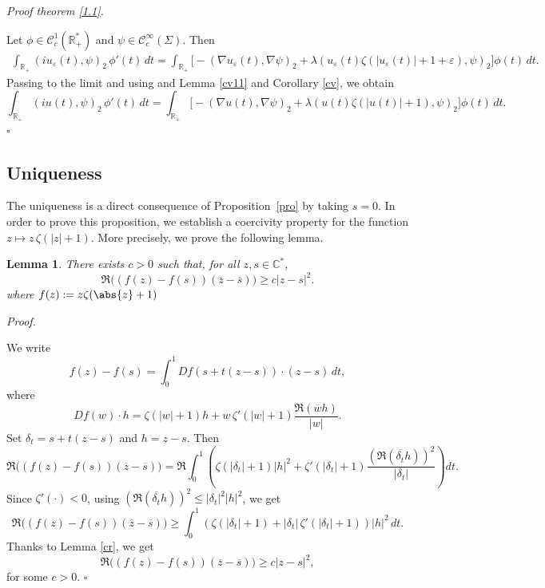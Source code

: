 \documentclass[10pt]{article}
\newtheorem{lemma}[theorem]{Lemma}
\renewenvironment{proof}[1][Proof]{%
  \noindent\textit{#1. }%
}{\hfill$\square$\vspace{4pt}}
\begin{document}
\begin{proof}[Proof theorem \ref{1.1}]
Let $\phi \in \mathcal{C}_c^1(\mathbb{R}_+^*)$ and $\psi \in \mathcal{C}_c^\infty(\Sigma)$. Then
\begin{align*}
\int_{\mathbb{R}_+} (i u_\varepsilon(t), \psi)_2 \, \phi'(t) \, dt
= \int_{\mathbb{R}_+} \Big[ - (\nabla u_\varepsilon(t), \nabla \psi)_2
+ \lambda (u_\varepsilon(t) \zeta(|u_\varepsilon(t)|+1+\varepsilon), \psi)_2 \Big] \phi(t) \, dt.
\end{align*}
Passing to the limit and using and Lemma \ref{cv11} and Corollary \ref{cv}, we obtain
\[
\int_{\mathbb{R}_+} (i u(t), \psi)_2 \, \phi'(t) \, dt
= \int_{\mathbb{R}_+} \Big[ - (\nabla u(t), \nabla \psi)_2
+ \lambda (u(t) \zeta(|u(t)|+1), \psi)_2 \Big] \phi(t) \, dt.
\]
\end{proof}







\subsection{Uniqueness}
The uniqueness is a direct consequence of Proposition~\ref{pro} by taking $s = 0$.
In order to prove this proposition, we establish a coercivity property for the function
$z \mapsto z\,\zeta(|z|+1)$.
More precisely, we prove the following lemma.

\begin{lemma}\label{uni}
There exists $c>0$ such that, for all $z,s \in \mathbb{C}^*$,
\[
\Re\big( (f(z)-f(s)) (\overline{z}-\overline{s}) \big) \ge c |z-s|^2.
\]
where $f(z):=z\zeta(\abs{z}+1)$
\end{lemma}

\begin{proof}
We write
\[
f(z)-f(s) = \int_0^1 Df(s+t(z-s)) \cdot (z-s) \, dt,
\]
where
\[
Df(w) \cdot h = \zeta(|w|+1) h + w \, \zeta'(|w|+1) \frac{\Re(\overline{w} h)}{|w|}.
\]
Set $\delta_t = s + t(z-s)$ and $h = z-s$. Then
\[
\Re\big((f(z)-f(s))(\overline{z}-\overline{s})\big)
= \Re \int_0^1 \left( \zeta(|\delta_t|+1) |h|^2 + \zeta'(|\delta_t|+1) \frac{(\Re(\overline{\delta_t} h))^2}{|\delta_t|} \right) dt.
\]
Since $\zeta'(\cdot) < 0$, using $(\Re(\overline{\delta_t} h))^2 \le |\delta_t|^2 |h|^2$, we get
\[
\Re\big((f(z)-f(s))(\overline{z}-\overline{s})\big) \ge \int_0^1 (\zeta(|\delta_t|+1) + |\delta_t| \, \zeta'(|\delta_t|+1)) |h|^2 \, dt.
\]
Thanks to Lemma \ref{cr}, we get
\[
\Re\big((f(z)-f(s))(\overline{z}-\overline{s})\big) \ge c |z-s|^2,
\]
for some $c > 0$.
\end{proof}
\end{document}
